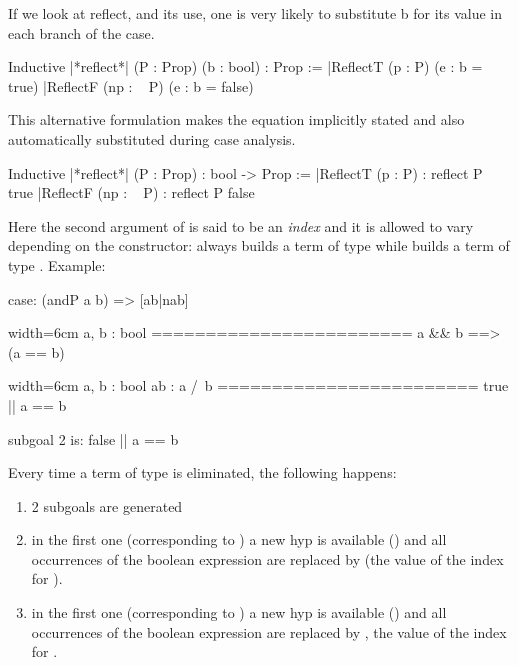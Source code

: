 If we look at reflect, and its use, one is very likely to substitute b
for its value in each branch of the case.

\begin{coq}{}{}
Inductive |*reflect*| (P : Prop) (b : bool) : Prop :=
|ReflectT (p : P)    (e : b = true)
|ReflectF (np : ~ P) (e : b = false)
\end{coq}

This alternative formulation makes the equation implicitly stated and
also automatically substituted during case analysis.

\begin{coq}{}{}
Inductive |*reflect*| (P : Prop) : bool -> Prop :=
|ReflectT (p : P)    : reflect P true
|ReflectF (np : ~ P) : reflect P false
\end{coq}

Here the second argument of  is said to be an \emph{index}
and it is allowed to vary depending on the constructor:  always
builds a term of type  while  builds
a term of type .
Example:

\begin{coq}{}{}
case: (andP a b) => [ab|nab]
\end{coq}

\begin{coqout}{}{width=6cm}
a, b : bool
========================
a && b ==> (a == b)
\end{coqout}
\begin{coqout}{}{width=6cm}
a, b : bool
ab : a /\ b
========================
true || a == b

subgoal 2 is:
false || a == b
\end{coqout}

Every time a term of type  is eliminated, the
following happens:
\begin{enumerate}
\item 2 subgoals are generated
\item in the first one (corresponding to ) a new hyp is
  available () and all occurrences of the boolean
  expression  are replaced by  (the value of the index
  for ).
\item in the first one (corresponding to ) a new hyp is
  available () and all occurrences of the boolean
  expression  are replaced by , the value of
  the index for .
\end{enumerate}


